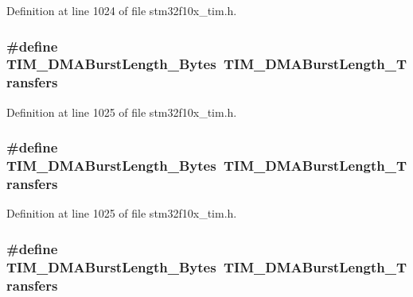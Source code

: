 Definition at line 1024 of file stm32f10x\+\_\+tim.\+h.

\subsubsection[{\texorpdfstring{T\+I\+M\+\_\+\+D\+M\+A\+Burst\+Length\+\_\+6\+Bytes}{TIM_DMABurstLength_6Bytes}}]{\setlength{\rightskip}{0pt plus 5cm}\#define T\+I\+M\+\_\+\+D\+M\+A\+Burst\+Length\+\_\+Bytes~{\bf T\+I\+M\+\_\+\+D\+M\+A\+Burst\+Length\+\_\+Transfers}}\hypertarget{group___t_i_m___legacy_ga7a9cc659b4fc010a31815254f6b57e3f}{}\label{group___t_i_m___legacy_ga7a9cc659b4fc010a31815254f6b57e3f}


Definition at line 1025 of file stm32f10x\+\_\+tim.\+h.

\subsubsection[{\texorpdfstring{T\+I\+M\+\_\+\+D\+M\+A\+Burst\+Length\+\_\+6\+Bytes}{TIM_DMABurstLength_6Bytes}}]{\setlength{\rightskip}{0pt plus 5cm}\#define T\+I\+M\+\_\+\+D\+M\+A\+Burst\+Length\+\_\+Bytes~{\bf T\+I\+M\+\_\+\+D\+M\+A\+Burst\+Length\+\_\+Transfers}}\hypertarget{group___t_i_m___legacy_ga7a9cc659b4fc010a31815254f6b57e3f}{}\label{group___t_i_m___legacy_ga7a9cc659b4fc010a31815254f6b57e3f}


Definition at line 1025 of file stm32f10x\+\_\+tim.\+h.

\subsubsection[{\texorpdfstring{T\+I\+M\+\_\+\+D\+M\+A\+Burst\+Length\+\_\+7\+Bytes}{TIM_DMABurstLength_7Bytes}}]{\setlength{\rightskip}{0pt plus 5cm}\#define T\+I\+M\+\_\+\+D\+M\+A\+Burst\+Length\+\_\+Bytes~{\bf T\+I\+M\+\_\+\+D\+M\+A\+Burst\+Length\+\_\+Transfers}}\hypertarget{group___t_i_m___legacy_ga5833cc5442c40a97a6a90bcd34a2e773}{}\label{group___t_i_m___legacy_ga5833cc5442c40a97a6a90bcd34a2e773}


